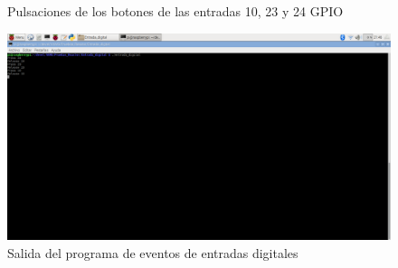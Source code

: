 \begin{itemize}
    
    \begin{figure}[htbp]
    \centering
    \caption{Pulsaciones de los botones de las entradas 10, 23 y 24 GPIO}
    \end{figure}
    
    \begin{figure}
    \centering
    \includegraphics[scale = 0.25]{anexo_a/figuras_dir/res1.jpg}
    \caption{Salida del programa de eventos de entradas digitales}
    \end{figure}


\end{itemize}
